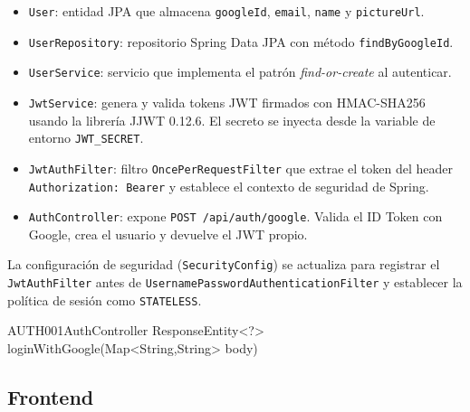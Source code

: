 \begin{itemize}
    \item \texttt{User}: entidad JPA que almacena \texttt{googleId}, \texttt{email}, \texttt{name} y \texttt{pictureUrl}.
    \item \texttt{UserRepository}: repositorio Spring Data JPA con método \texttt{findByGoogleId}.
    \item \texttt{UserService}: servicio que implementa el patrón \textit{find-or-create} al autenticar.
    \item \texttt{JwtService}: genera y valida tokens JWT firmados con HMAC-SHA256 usando la librería JJWT 0.12.6. El secreto se inyecta desde la variable de entorno \texttt{JWT\_SECRET}.
    \item \texttt{JwtAuthFilter}: filtro \texttt{OncePerRequestFilter} que extrae el token del header \texttt{Authorization: Bearer} y establece el contexto de seguridad de Spring.
    \item \texttt{AuthController}: expone \texttt{POST /api/auth/google}. Valida el ID Token con Google, crea el usuario y devuelve el JWT propio.
\end{itemize}

La configuración de seguridad (\texttt{SecurityConfig}) se actualiza para registrar el \texttt{JwtAuthFilter} antes de \texttt{UsernamePasswordAuthenticationFilter} y establecer la política de sesión como \texttt{STATELESS}.

\begin{asigResponsabilidad}{AUTH001}{AuthController}
{ResponseEntity<?> loginWithGoogle(Map<String,String> body)}
\cabeceraMetodosBajoNivel
{}
\end{asigResponsabilidad}

\subsection{Frontend}

